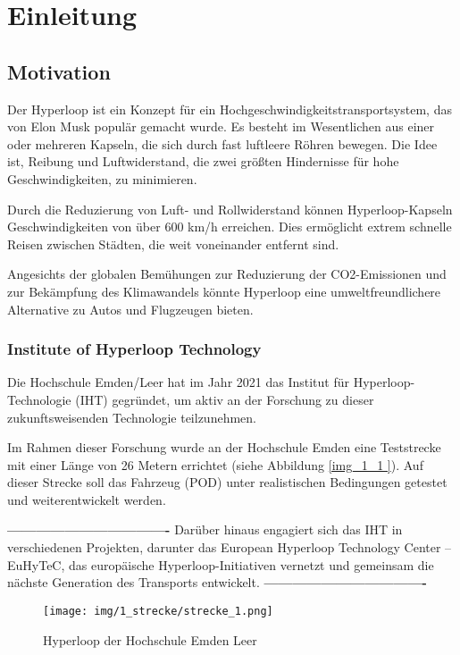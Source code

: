 \chapter{Einleitung}

\section{Motivation}
Der Hyperloop ist ein Konzept für ein Hochgeschwindigkeitstransportsystem, das von Elon Musk \cite{tesla:Hyperloop_impact} populär gemacht wurde. Es besteht im Wesentlichen aus einer oder mehreren Kapseln, die sich durch fast luftleere Röhren bewegen. Die Idee ist, Reibung und Luftwiderstand, die zwei größten Hindernisse für hohe Geschwindigkeiten, zu minimieren.

Durch die Reduzierung von Luft- und Rollwiderstand können Hyperloop-Kapseln Geschwindigkeiten von über 600 km/h erreichen. Dies ermöglicht extrem schnelle Reisen zwischen Städten, die weit voneinander entfernt sind.

Angesichts der globalen Bemühungen zur Reduzierung der CO2-Emissionen und zur Bekämpfung des Klimawandels könnte Hyperloop eine umweltfreundlichere Alternative zu Autos und Flugzeugen bieten.



\subsection{Institute of Hyperloop Technology}
Die Hochschule Emden/Leer hat im Jahr 2021 das Institut für Hyperloop-Technologie (IHT) gegründet, um aktiv an der Forschung zu dieser zukunftsweisenden Technologie teilzunehmen.

Im Rahmen dieser Forschung wurde an der Hochschule Emden eine Teststrecke mit einer Länge von 26 Metern errichtet (siehe Abbildung \ref{img_1_1
}). Auf dieser Strecke soll das Fahrzeug (POD) unter realistischen Bedingungen getestet und weiterentwickelt werden.

\textbf{----------------------------------}\newline
Darüber hinaus engagiert sich das IHT in verschiedenen Projekten, darunter das \frqq European Hyperloop Technology Center – EuHyTeC\flqq, das europäische Hyperloop-Initiativen vernetzt und gemeinsam die nächste Generation des Transports entwickelt.\newline
\textbf{----------------------------------}

\begin{figure}[ht]
	\begin{center}
		\texttt{[image: img/1\_strecke/strecke\_1.png]}
		\caption{Hyperloop der Hochschule Emden Leer}
		\label{img_1_1:strecke}
	\end{center}
\end{figure}
\newpage


